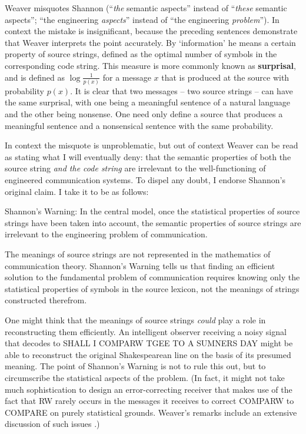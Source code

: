 \documentclass[12pt]{article}
\begin{document}
\noindent Weaver misquotes Shannon (``\emph{the} semantic aspects'' instead of ``\emph{these} semantic aspects''; ``the engineering \textit{aspects}'' instead of ``the engineering \textit{problem}'').
In context the mistake is insignificant, because the preceding sentences demonstrate that Weaver interprets the point accurately.
By `information' he means a certain property of source strings, defined as the optimal number of symbols in the corresponding code string.
This measure is more commonly known as \textbf{surprisal}, and is defined as $\log{\frac{1}{p(x)}}$ for a message $x$ that is produced at the source with probability $p(x)$.
It is clear that two messages -- two source strings -- can have the same surprisal, with one being a meaningful sentence of a natural language and the other being nonsense.
One need only define a source that produces a meaningful sentence and a nonsensical sentence with the same probability.

In context the misquote is unproblematic, but out of context Weaver can be read as stating what I will eventually deny: that the semantic properties of both the source string \textit{and the code string} are irrelevant to the well-functioning of engineered communication systems.
To dispel any doubt, I endorse Shannon's original claim.
I take it to be as follows:

\begin{myquote}
{\sc Shannon's Warning}: In the central model, once the statistical properties of source strings have been taken into account, the semantic properties of source strings are irrelevant to the engineering problem of communication.
\end{myquote}

\noindent The meanings of source strings are not represented in the mathematics of communication theory.
{\sc Shannon's Warning} tells us that finding an efficient solution to the fundamental problem of communication requires knowing only the statistical properties of symbols in the source lexicon, not the meanings of strings constructed therefrom.

One might think that the meanings of source strings \emph{could} play a role in reconstructing them efficiently.
An intelligent observer receiving a noisy signal that decodes to {\sc SHALL I COMPARW TGEE TO A SUMNERS DAY} might be able to reconstruct the original Shakespearean line on the basis of its presumed meaning.
The point of {\sc Shannon's Warning} is not to rule this out, but to circumscribe the statistical aspects of the problem.
(In fact, it might not take much sophistication to design an error-correcting receiver that makes use of the fact that {\sc RW} rarely occurs in the messages it receives to correct {\sc COMPARW} to {\sc COMPARE} on purely statistical grounds.
Weaver's remarks include an extensive discussion of such issues \citep[$\S$2]{shannon1949mathematical}.)
\end{document}
